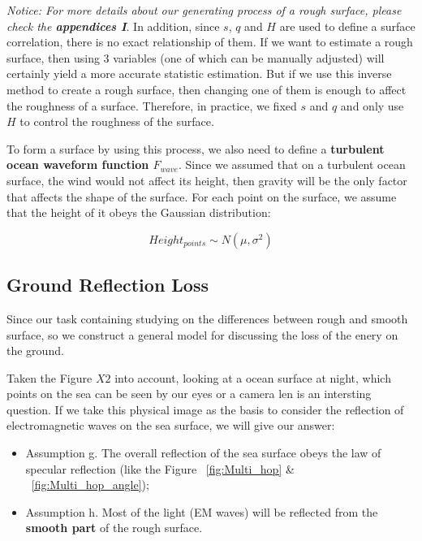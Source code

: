 \documentclass{mcmthesis}
\begin{document}
    \emph{Notice: For more details about our generating process of a rough surface, please check the \textbf{appendices I}}.
    In addition, since $s$, $q$ and $H$ are used to define a surface correlation, there is no exact relationship of them. If we want to estimate a rough surface, then using 3 variables (one of which can be manually adjusted) will certainly yield a more accurate statistic estimation. But if we use this inverse method to create a rough surface, then changing one of them is enough to affect the roughness of a surface. Therefore, in practice, we fixed $s$ and $q$ and only use $H$ to control the roughness of the surface.

    To form a surface by using this process, we also need to define a \textbf{turbulent ocean waveform function $F_{wave}$}. Since we assumed that on a turbulent ocean surface, the wind would not affect its height, then gravity will be the only factor that affects the shape of the surface. For each point on the surface, we assume that the height of it obeys the Gaussian distribution:

    \begin{equation}\label{eq:Height_Gaussian}
      Height_{points} \sim N(\mu,\sigma^2)
    \end{equation}







  \subsection{Ground Reflection Loss}
    Since our task containing studying on the differences between rough and smooth surface, so we construct a general model for discussing the loss of the enery on the ground.

    Taken the Figure $X2$ into account, looking at a ocean surface at night, which points on the sea can be seen by our eyes or a camera len is an intersting question. If we take this physical image as the basis to consider the reflection of electromagnetic waves on the sea surface, we will give our answer:

    \begin{itemize}
      \item Assumption g. The overall reflection of the sea surface obeys the law of specular reflection (like the Figure ~\ref{fig:Multi_hop} \& ~\ref{fig:Multi_hop_angle}); \\
      \item Assumption h. Most of the light (EM waves) will be reflected from the \textbf{smooth part} of the rough surface. \\
    \end{itemize}
\end{document}
